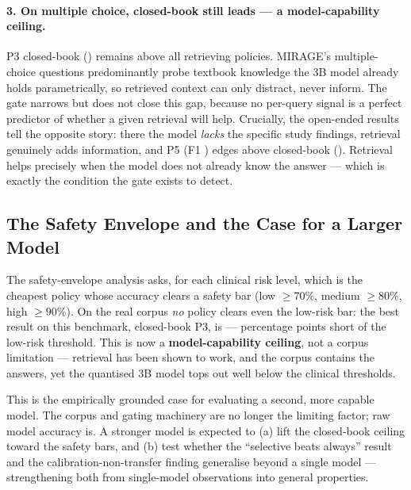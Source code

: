 \paragraph{3. On multiple choice, closed-book still leads --- a model-capability
ceiling.} P3 closed-book (\accPthreeMcq) remains above all retrieving policies. MIRAGE's
multiple-choice questions predominantly probe textbook knowledge the 3B model
already holds parametrically, so retrieved context can only distract, never inform.
The gate narrows but does not close this gap, because no per-query signal is a
perfect predictor of whether a given retrieval will help. Crucially, the
open-ended results tell the opposite story: there the model \emph{lacks} the
specific study findings, retrieval genuinely adds information, and P5 (F1 \fOnePfiveOpen)
edges above closed-book (\fOnePthreeOpen). Retrieval helps precisely when the model does not
already know the answer --- which is exactly the condition the gate exists to
detect.

\subsection{The Safety Envelope and the Case for a Larger Model}
\label{sec:week4-envelope}

The safety-envelope analysis asks, for each clinical risk level, which is the
cheapest policy whose accuracy clears a safety bar (low $\geq$70\%, medium
$\geq$80\%, high $\geq$90\%). On the real corpus \emph{no} policy clears even the
low-risk bar: the best result on this benchmark, closed-book P3, is \accPthreeMcq{}
--- \gapToLowBar{} percentage points short of the \barLow{} low-risk threshold. This is
now a \textbf{model-capability ceiling}, not a corpus limitation --- retrieval has
been shown to work, and the corpus contains the answers, yet the quantised 3B
model tops out well below the clinical thresholds.

This is the empirically grounded case for evaluating a second, more capable model.
The corpus and gating machinery are no longer the limiting factor; raw model
accuracy is. A stronger model is expected to (a) lift the closed-book ceiling
toward the safety bars, and (b) test whether the ``selective beats always'' result
and the calibration-non-transfer finding generalise beyond a single model ---
strengthening both from single-model observations into general properties.


